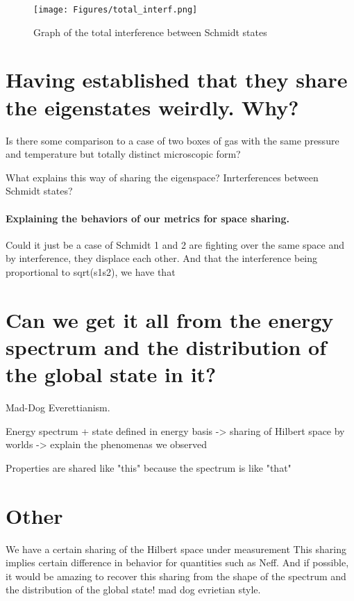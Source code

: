 \documentclass{article}
\begin{document}
\begin{figure}
    \centering
    \texttt{[image: Figures/total\_interf.png]}
    \caption{Graph of the total interference between Schmidt states}
    \label{fig:total_interference}
\end{figure}

\section{Having established that they share the eigenstates weirdly. Why?}

Is there some comparison to a case of two boxes of gas with the same pressure and temperature but totally distinct microscopic form?

What explains this way of sharing the eigenspace?
Inrterferences between Schmidt states? 

\paragraph{Explaining the behaviors of our metrics for space sharing.}

Could it just be a case of Schmidt 1 and 2 are fighting over the same space and by interference, they displace each other. And that the interference being proportional to sqrt(s1s2), we have that


\section{Can we get it all from the energy spectrum and the distribution of the global state in it?}

Mad-Dog Everettianism.

Energy spectrum + state defined in energy basis -> sharing of Hilbert space by worlds -> explain the phenomenas we observed

Properties are shared like "this" because the spectrum is like "that"



\section{Other}


We have a certain sharing of the Hilbert space under measurement
This sharing implies certain difference in behavior for quantities such as Neff. And if possible, it would be amazing to recover this sharing from the shape of the spectrum and the distribution of the global state!  mad dog evrietian style.
\end{document}
